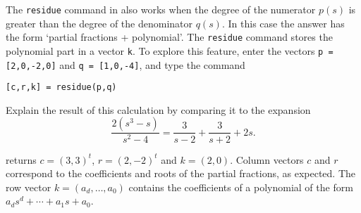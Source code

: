 \documentclass{ximera}
\begin{document}
\begin{computerExercise} \label{c13.3.4}
The {\tt residue} command in \Matlab also works when the degree of the
numerator $p(s)$ is greater than the degree of the denominator $q(s)$.
In this case the answer has the form `partial fractions + polynomial'.
The {\tt residue} command stores the polynomial part in a vector {\tt k}.
To explore this feature, enter the vectors {\tt p = [2,0,-2,0]} and
{\tt q = [1,0,-4]}, and type the command
\begin{verbatim}
[c,r,k] = residue(p,q)
\end{verbatim}
Explain the result of this calculation by comparing it to the expansion
\[
\frac{2(s^3-s)}{s^2-4} = \frac{3}{s-2} + \frac{3}{s+2} +2s.
\]

\begin{solution}

\Matlab returns $c = (3,3)^t$, $r = (2,-2)^t$ and $k = (2,0)$.
Column vectors $c$ and $r$ correspond to the coefficients and roots of
the partial fractions, as expected.  The row vector $k =
(a_d,\dots,a_0)$ contains the coefficients of a polynomial of the form
$a_ds^d + \cdots + a_1s + a_0$.

\end{solution}
\end{computerExercise}
\end{document}
